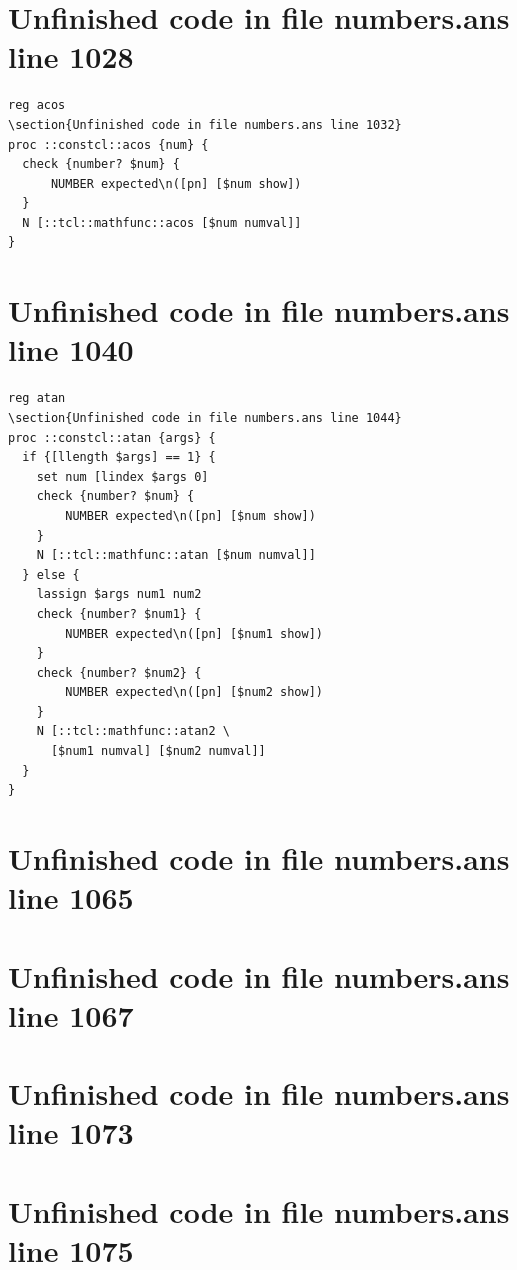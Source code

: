 \documentclass[twoside,9pt]{report}
\begin{document}
\section{Unfinished code in file numbers.ans line 1028}
\begin{lstlisting}
reg acos
\section{Unfinished code in file numbers.ans line 1032}
proc ::constcl::acos {num} {
  check {number? $num} {
      NUMBER expected\n([pn] [$num show])
  }
  N [::tcl::mathfunc::acos [$num numval]]
}
\end{lstlisting}
\section{Unfinished code in file numbers.ans line 1040}
\begin{lstlisting}
reg atan
\section{Unfinished code in file numbers.ans line 1044}
proc ::constcl::atan {args} {
  if {[llength $args] == 1} {
    set num [lindex $args 0]
    check {number? $num} {
        NUMBER expected\n([pn] [$num show])
    }
    N [::tcl::mathfunc::atan [$num numval]]
  } else {
    lassign $args num1 num2
    check {number? $num1} {
        NUMBER expected\n([pn] [$num1 show])
    }
    check {number? $num2} {
        NUMBER expected\n([pn] [$num2 show])
    }
    N [::tcl::mathfunc::atan2 \
      [$num1 numval] [$num2 numval]]
  }
}
\end{lstlisting}
\section{Unfinished code in file numbers.ans line 1065}
\section{Unfinished code in file numbers.ans line 1067}
\section{Unfinished code in file numbers.ans line 1073}
\section{Unfinished code in file numbers.ans line 1075}
\end{document}
